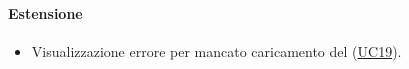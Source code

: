 \paragraph*{Estensione}
\begin{itemize}
  \item Visualizzazione errore per mancato caricamento del  (\hyperref[UC19]{UC19}).
\end{itemize}